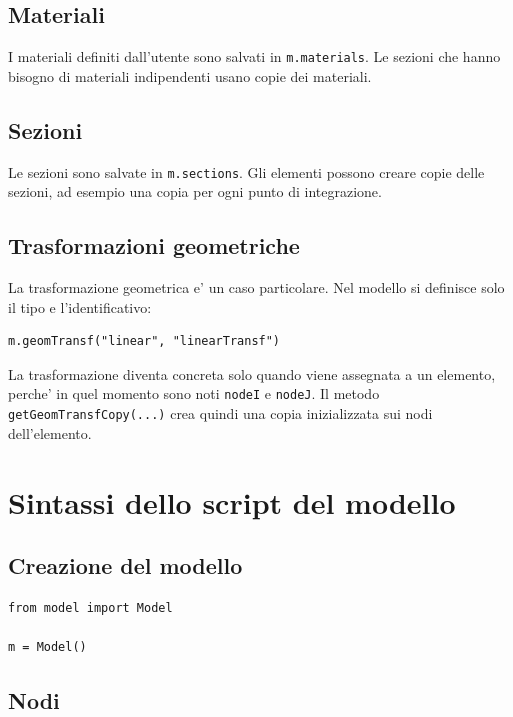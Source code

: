 \documentclass[11pt,a4paper]{article}
\begin{document}
\subsection{Materiali}

I materiali definiti dall'utente sono salvati in \texttt{m.materials}. Le sezioni
che hanno bisogno di materiali indipendenti usano copie dei materiali.

\subsection{Sezioni}

Le sezioni sono salvate in \texttt{m.sections}. Gli elementi possono creare copie
delle sezioni, ad esempio una copia per ogni punto di integrazione.

\subsection{Trasformazioni geometriche}

La trasformazione geometrica e' un caso particolare. Nel modello si definisce
solo il tipo e l'identificativo:

\begin{lstlisting}[style=pythonstyle]
m.geomTransf("linear", "linearTransf")
\end{lstlisting}

La trasformazione diventa concreta solo quando viene assegnata a un elemento,
perche' in quel momento sono noti \texttt{nodeI} e \texttt{nodeJ}. Il metodo
\texttt{getGeomTransfCopy(...)} crea quindi una copia inizializzata sui nodi
dell'elemento.

\section{Sintassi dello script del modello}

\subsection{Creazione del modello}

\begin{lstlisting}[style=pythonstyle]
from model import Model

m = Model()
\end{lstlisting}

\subsection{Nodi}
\end{document}
